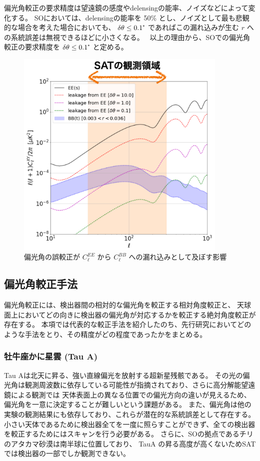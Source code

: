 \documentclass[../../main.tex]{subfiles}
\begin{document}
偏光角較正の要求精度は望遠鏡の感度やdelensingの能率、ノイズなどによって変化する。
SOにおいては、delensingの能率を 50\% とし、ノイズとして最も悲観的な場合を考えた場合においても、
$\delta\theta \leq 0.1\tcdegree$ であればこの漏れ込みが生む $r$ への系統誤差は無視できるほどに小さくなる。~\cite{so:Bryan_2018}
以上の理由から、SOでの偏光角較正の要求精度を $\delta\theta \leq 0.1\tcdegree$ と定める。

\begin{figure}[H]
    \centering
    \includegraphics[width=0.9\textwidth]{simons_observatory/EtoB_leakage.pdf}
    \caption{偏光角の誤較正が $C_{\ell}^{EE}$ から $C_{\ell}^{BB}$ への漏れ込みとして及ぼす影響}
    \label{fig:so-EtoBleakage}
\end{figure}

\subsection{偏光角較正手法}
偏光角較正には、検出器間の相対的な偏光角を較正する相対角度較正と、
天球面上においてどの向きに検出器の偏光角が対応するかを較正する絶対角度較正が存在する。
本項では代表的な較正手法を紹介したのち、先行研究においてどのような手法をとり、その精度がどの程度であったかをまとめる。
\subsubsection{牡牛座かに星雲 (Tau A)}
Tau Aは北天に昇る、強い直線偏光を放射する超新星残骸である。
その光の偏光角は観測周波数に依存している可能性が指摘されており、さらに高分解能望遠鏡による観測では
天体表面上の異なる位置での偏光方向の違いが見えるため、偏光角を一意に決定することが難しいという課題がある。
また、偏光角は他の実験の観測結果にも依存しており、これらが潜在的な系統誤差として存在する。
小さい天体であるために検出器全てを一度に照らすことができず、全ての検出器を較正するためにはスキャンを行う必要がある。
さらに、SOの拠点であるチリのアタカマ砂漠は南半球に位置しており、
TauA の昇る高度が高くないためSATでは検出器の一部でしか観測できない。
\end{document}
